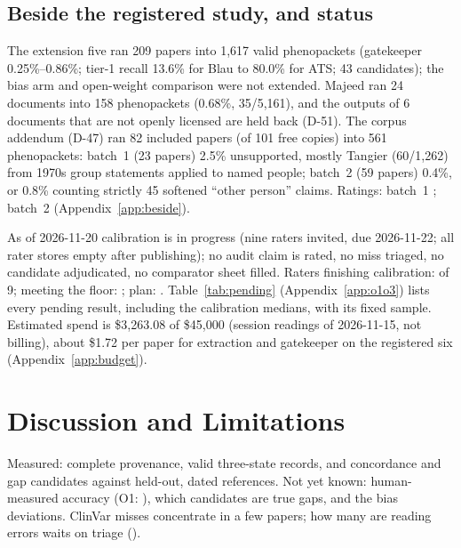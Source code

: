 \documentclass{article} %
\begin{document}
\subsection{Beside the registered study, and status}
\label{sec:beside}
The extension five ran 209 papers into 1,617 valid phenopackets (gatekeeper 0.25\%--0.86\%; tier-1 recall 13.6\% for Blau to 80.0\% for ATS; 43 candidates); the bias arm and open-weight comparison were not extended. Majeed ran 24 documents into 158 phenopackets (0.68\%, 35/5,161), and the outputs of 6 documents that are not openly licensed are held back (D-51). The corpus addendum (D-47) ran 82 included papers (of 101 free copies) into 561 phenopackets: batch~1 (23 papers) 2.5\% unsupported, mostly Tangier (60/1,262) from 1970s group statements applied to named people; batch~2 (59 papers) 0.4\%, or 0.8\% counting strictly 45 softened ``other person'' claims. Ratings: batch~1 ; batch~2  (Appendix~\ref{app:beside}).

As of 2026-11-20 calibration is in progress (nine raters invited, due 2026-11-22; all rater stores empty after publishing); no audit claim is rated, no miss triaged, no candidate adjudicated, no comparator sheet filled. Raters finishing calibration:  of 9; meeting the floor: ; plan: . Table~\ref{tab:pending} (Appendix~\ref{app:o1o3}) lists every pending result, including the calibration medians, with its fixed sample. Estimated spend is \$3,263.08 of \$45,000 (session readings of 2026-11-15, not billing), about \$1.72 per paper for extraction and gatekeeper on the registered six (Appendix~\ref{app:budget}).

\section{Discussion and Limitations}
\label{sec:discussion}
Measured: complete provenance, valid three-state records, and concordance and gap candidates against held-out, dated references. Not yet known: human-measured accuracy (O1: ), which candidates are true gaps, and the bias deviations. ClinVar misses concentrate in a few papers; how many are reading errors waits on triage ().
\end{document}
